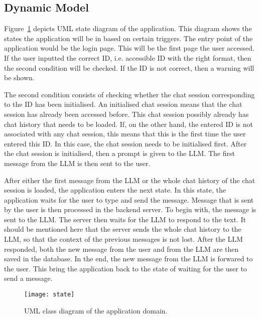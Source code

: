 \subsection{Dynamic Model}


Figure~\ref{state} depicts UML state diagram of the application.
This diagram shows the states the application will be in based on certain triggers.
The entry point of the application would be the login page.
This will be the first page the user accessed.
If the user inputted the correct ID, i.e. accessible ID with the right format, then the second condition will be checked.
If the ID is not correct, then a warning will be shown.

The second condition consists of checking whether the chat session corresponding to the ID has been initialised.
An initialised chat session means that the chat session has already been accessed before.
This chat session possibly already has chat history that needs to be loaded.
If, on the other hand, the entered ID is not associated with any chat session, this means that this is the first time the user entered this ID.
In this case, the chat session needs to be initialised first.
After the chat session is initialised, then a prompt is given to the \ac{LLM}.
The first message from the \ac{LLM} is then sent to the user.

After either the first message from the \ac{LLM} or the whole chat history of the chat session is loaded, the application enters the next state.
In this state, the application waits for the user to type and send the message.
Message that is sent by the user is then processed in the backend server.
To begin with, the message is sent to the \ac{LLM}.
The server then waits for the \ac{LLM} to respond to the text.
It should be mentioned here that the server sends the whole chat history to the \ac{LLM}, so that the context of the previous messages is not lost.
After the \ac{LLM} responded, both the new message from the user and from the \ac{LLM} are then saved in the database.
In the end, the new message from the \ac{LLM} is forwared to the user.
This bring the application back to the state of waiting for the user to send a message.

\begin{figure}[h!]
    \centering
    \texttt{[image: state]}
    \caption{UML class diagram of the application domain.}\label{state}
\end{figure}

